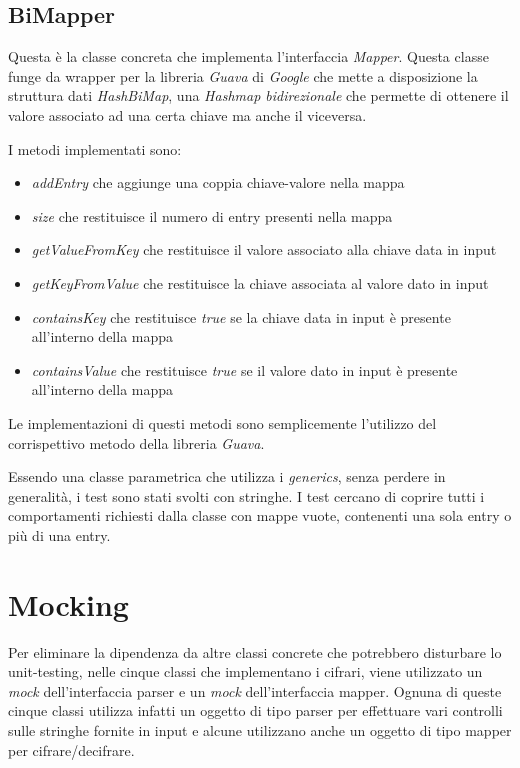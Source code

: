 		\subsection{BiMapper}
				Questa è la classe concreta che implementa l'interfaccia \emph{Mapper}. Questa classe funge da wrapper per la libreria \emph{Guava} di \emph{Google} che mette a disposizione la struttura dati \emph{HashBiMap}, una \emph{Hashmap bidirezionale} che permette di ottenere il valore associato ad una certa chiave ma anche il viceversa.
				
				I metodi implementati sono:
				\begin{itemize}
					\item \emph{addEntry} che aggiunge una coppia chiave-valore nella mappa
					\item \emph{size} che restituisce il numero di entry presenti nella mappa
					\item \emph{getValueFromKey} che restituisce il valore associato alla chiave data in input
					\item \emph{getKeyFromValue} che restituisce la chiave associata al valore dato in input
					\item \emph{containsKey} che restituisce \emph{true} se la chiave data in input è presente all'interno della mappa
					\item \emph{containsValue} che restituisce \emph{true} se il valore dato in input è presente all'interno della mappa
				\end{itemize}
				
				Le implementazioni di questi metodi sono semplicemente l'utilizzo del corrispettivo metodo della libreria \emph{Guava}. 
				
				Essendo una classe parametrica che utilizza i \emph{generics}, senza perdere in generalità, i test sono stati svolti con stringhe. I test cercano di coprire tutti i comportamenti richiesti dalla classe con mappe vuote, contenenti una sola entry o più di una entry.
			
	\section{Mocking}
		Per eliminare la dipendenza da altre classi concrete che potrebbero disturbare lo unit-testing, nelle cinque classi che implementano i cifrari, viene utilizzato un \emph{mock} dell'interfaccia parser e un \emph{mock} dell'interfaccia mapper. Ognuna di queste cinque classi utilizza infatti un oggetto di tipo parser per effettuare vari controlli sulle stringhe fornite in input e alcune utilizzano anche un oggetto di tipo mapper per cifrare/decifrare.
		
